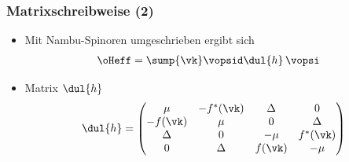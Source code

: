 \begin{frame}
    \frametitle{Matrixschreibweise (2)}
    \begin{itemize}
        \item Mit Nambu-Spinoren umgeschrieben ergibt sich 
        \begin{align*}
            \oHeff &= \sump{\vk} \vopsid \dul{h} \, \vopsi 
        \end{align*}
        \item Matrix $\dul{h}$
        \begin{align*}
            \dul{h} = \begin{pmatrix} \mu & -f^*(\vk) & \Delta & 0 \\ -f(\vk) & \mu & 0 & \Delta \\ \Delta & 0 & -\mu & f^*(\vk) \\ 0 & \Delta & f(\vk) & -\mu \end{pmatrix}
        \end{align*}
    \end{itemize}
\end{frame}

